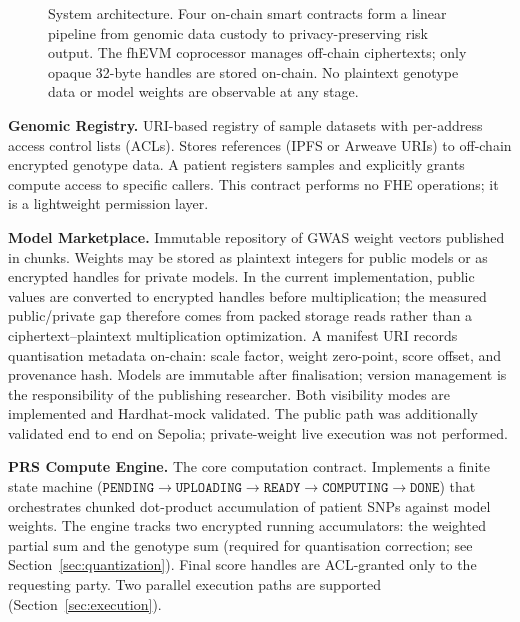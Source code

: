 \documentclass[10pt,twocolumn]{article}
\begin{document}
\begin{figure}[t]
  \centering
  \caption{System architecture.  Four on-chain smart contracts form a linear pipeline
  from genomic data custody to privacy-preserving risk output.  The fhEVM coprocessor
  manages off-chain ciphertexts; only opaque 32-byte handles are stored on-chain.
  No plaintext genotype data or model weights are observable at any stage.}
  \label{fig:arch}
\end{figure}

\textbf{Genomic Registry.}
URI-based registry of sample datasets with per-address access control lists (ACLs).
Stores references (IPFS or Arweave URIs) to off-chain encrypted genotype data.
A patient registers samples and explicitly grants compute access to specific callers.
This contract performs no FHE operations; it is a lightweight permission layer.

\textbf{Model Marketplace.}
Immutable repository of GWAS weight vectors published in chunks.  Weights may be
stored as plaintext integers for public models or as encrypted handles for private
models.  In the current implementation, public values are converted to encrypted
handles before multiplication; the measured public/private gap therefore comes from
packed storage reads rather than a ciphertext--plaintext multiplication optimization.
A manifest URI
records quantisation metadata on-chain: scale factor, weight zero-point, score
offset, and provenance hash.  Models are immutable after finalisation; version
management is the responsibility of the publishing researcher.  Both visibility
modes are implemented and Hardhat-mock validated.  The public path was additionally
validated end to end on Sepolia; private-weight live execution was not performed.

\textbf{PRS Compute Engine.}
The core computation contract.  Implements a finite state machine
($\texttt{PENDING}\!\to\!\texttt{UPLOADING}\!\to\!\texttt{READY}\!\to\!\texttt{COMPUTING}\!\to\!\texttt{DONE}$)
that orchestrates chunked dot-product accumulation of patient SNPs against model
weights.  The engine tracks two encrypted running accumulators: the weighted partial
sum and the genotype sum (required for quantisation correction; see
Section~\ref{sec:quantization}).  Final score handles are ACL-granted only to the
requesting party.  Two parallel execution paths are supported (Section~\ref{sec:execution}).
\end{document}
